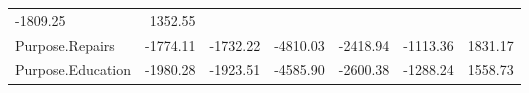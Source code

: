 \documentclass[]{article}
\begin{document}
\begin{longtable}[]{@{}lrrrrrr@{}}
\begin{minipage}[t]{0.08\columnwidth}
-1809.25\strut
\end{minipage} & \begin{minipage}[t]{0.08\columnwidth}\raggedleft\strut
1352.55\strut
\end{minipage}\tabularnewline
\begin{minipage}[t]{0.31\columnwidth}\raggedright\strut
Purpose.Repairs\strut
\end{minipage} & \begin{minipage}[t]{0.10\columnwidth}\raggedleft\strut
-1774.11\strut
\end{minipage} & \begin{minipage}[t]{0.08\columnwidth}\raggedleft\strut
-1732.22\strut
\end{minipage} & \begin{minipage}[t]{0.08\columnwidth}\raggedleft\strut
-4810.03\strut
\end{minipage} & \begin{minipage}[t]{0.08\columnwidth}\raggedleft\strut
-2418.94\strut
\end{minipage} & \begin{minipage}[t]{0.08\columnwidth}\raggedleft\strut
-1113.36\strut
\end{minipage} & \begin{minipage}[t]{0.08\columnwidth}\raggedleft\strut
1831.17\strut
\end{minipage}\tabularnewline
\begin{minipage}[t]{0.31\columnwidth}\raggedright\strut
Purpose.Education\strut
\end{minipage} & \begin{minipage}[t]{0.10\columnwidth}\raggedleft\strut
-1980.28\strut
\end{minipage} & \begin{minipage}[t]{0.08\columnwidth}\raggedleft\strut
-1923.51\strut
\end{minipage} & \begin{minipage}[t]{0.08\columnwidth}\raggedleft\strut
-4585.90\strut
\end{minipage} & \begin{minipage}[t]{0.08\columnwidth}\raggedleft\strut
-2600.38\strut
\end{minipage} & \begin{minipage}[t]{0.08\columnwidth}\raggedleft\strut
-1288.24\strut
\end{minipage} & \begin{minipage}[t]{0.08\columnwidth}\raggedleft\strut
1558.73\strut
\end{minipage}\tabularnewline

\end{longtable}
\end{document}
